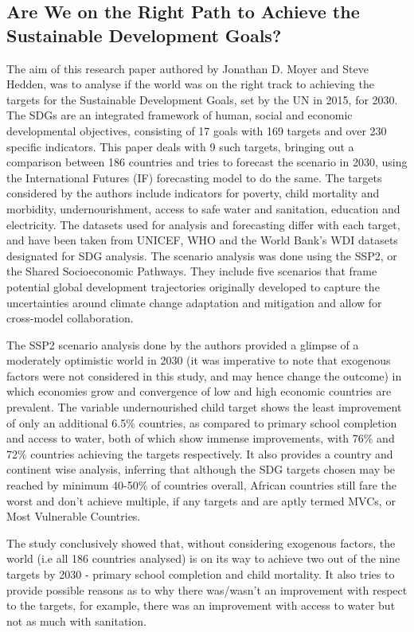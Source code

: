 \documentclass[conference]{IEEEtran}
\begin{document}
\subsection{Are We on the Right Path to Achieve the Sustainable Development Goals?}
The aim of this research paper authored by Jonathan D. Moyer and Steve Hedden, was to analyse if the world was on the right track to achieving the targets for the Sustainable Development Goals, set by the UN in 2015, for 2030. The SDGs are an integrated framework of human, social and economic developmental objectives, consisting of 17 goals with 169 targets and over 230 specific indicators. This paper deals with 9 such targets, bringing out a comparison between 186 countries and tries to forecast the scenario in 2030, using the International Futures (IF) forecasting model to do the same. The targets considered by the authors include indicators for poverty, child mortality and morbidity, undernourishment, access to safe water and sanitation, education and electricity. The datasets used for analysis and forecasting differ with each target, and have been taken from UNICEF, WHO and the World Bank's WDI datasets designated for SDG analysis.\newline
The scenario analysis was done using the SSP2, or the Shared Socioeconomic Pathways. They include five scenarios that frame potential global development trajectories originally developed to capture the uncertainties around climate change adaptation and mitigation and allow for cross-model collaboration.

The SSP2 scenario analysis done by the authors provided a glimpse of a moderately optimistic world in 2030 (it was imperative to note that exogenous factors were not considered in this study, and may hence change the outcome) in which economies grow and convergence of low and high economic countries are prevalent. The variable undernourished child target shows the least improvement of only an additional 6.5\% countries, as compared to primary school completion and access to water, both of which show immense improvements, with 76\% and 72\% countries achieving the targets respectively. It also provides a country and continent wise analysis, inferring that although the SDG targets chosen may be reached by minimum 40-50\% of countries overall, African countries still fare the worst and don't achieve multiple, if any targets and are aptly termed MVCs, or Most Vulnerable Countries.

The study conclusively showed that, without considering exogenous factors, the world (i.e all 186 countries analysed) is on its way to achieve two out of the nine targets by 2030 - primary school completion and child mortality. It also tries to provide possible reasons as to why there was/wasn’t an improvement with respect to the targets, for example, there was an improvement with access to water but not as much with sanitation. 
\end{document}
